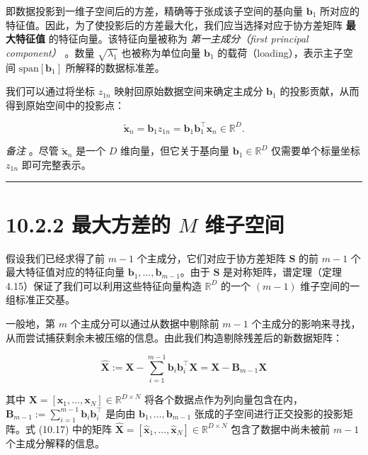 即数据投影到一维子空间后的方差，精确等于张成该子空间的基向量 $ \boldsymbol{b}_1 $ 所对应的特征值。因此，为了使投影后的方差最大化，我们应当选择对应于协方差矩阵 \textbf{最大特征值} 的特征向量。该特征向量被称为 \emph{第一主成分（first principal component）} 。数量 $ \sqrt{\lambda_1} $ 也被称为单位向量 $ \boldsymbol{b}_1 $ 的载荷（loading），表示主子空间 $ \text{span}[\boldsymbol{b}_1] $ 所解释的数据标准差。

我们可以通过将坐标 $ z_{1n} $ 映射回原始数据空间来确定主成分 $ \boldsymbol{b}_1 $ 的投影贡献，从而得到原始空间中的投影点：

\begin{equation}
\tilde{\boldsymbol{x}}_n = \boldsymbol{b}_1 z_{1n} = \boldsymbol{b}_1 \boldsymbol{b}_1^\top \boldsymbol{x}_n \in \mathbb{R}^D .
\tag{10.16}
\end{equation}

\emph{备注} 。尽管 $ \tilde{\boldsymbol{x}}_n $ 是一个 $ D $ 维向量，但它关于基向量 $ \boldsymbol{b}_1 \in \mathbb{R}^D $ 仅需要单个标量坐标 $ z_{1n} $ 即可完整表示。

\medskip\hrule\medskip

\section*{10.2.2 最大方差的 $ M $ 维子空间}

假设我们已经求得了前 $ m-1 $ 个主成分，它们对应于协方差矩阵 $ \boldsymbol{S} $ 的前 $ m-1 $ 个最大特征值对应的特征向量 $ \boldsymbol{b}_1, \ldots, \boldsymbol{b}_{m-1} $。由于 $ \boldsymbol{S} $ 是对称矩阵，谱定理（定理 4.15）保证了我们可以利用这些特征向量构造 $ \mathbb{R}^D $ 的一个 $ (m-1) $ 维子空间的一组标准正交基。

一般地，第 $ m $ 个主成分可以通过从数据中剔除前 $ m-1 $ 个主成分的影响来寻找，从而尝试捕获剩余未被压缩的信息。由此我们构造剔除残差后的新数据矩阵：

\begin{equation}
\hat{\boldsymbol{X}} := \boldsymbol{X} - \sum_{i=1}^{m-1}\boldsymbol{b}_i \boldsymbol{b}_i^\top \boldsymbol{X} = \boldsymbol{X} - \boldsymbol{B}_{m-1}\boldsymbol{X}
\tag{10.17}
\end{equation}

其中 $ \boldsymbol{X} = [\boldsymbol{x}_1, \ldots, \boldsymbol{x}_N] \in \mathbb{R}^{D \times N} $ 将各个数据点作为列向量包含在内，$ \boldsymbol{B}_{m-1} := \sum_{i=1}^{m-1}\boldsymbol{b}_i \boldsymbol{b}_i^\top $ 是向由 $ \boldsymbol{b}_1, \ldots, \boldsymbol{b}_{m-1} $ 张成的子空间进行正交投影的投影矩阵。式 (10.17) 中的矩阵 $ \hat{\boldsymbol{X}} = [\hat{\boldsymbol{x}}_1, \ldots, \hat{\boldsymbol{x}}_N] \in \mathbb{R}^{D \times N} $ 包含了数据中尚未被前 $ m-1 $ 个主成分解释的信息。

